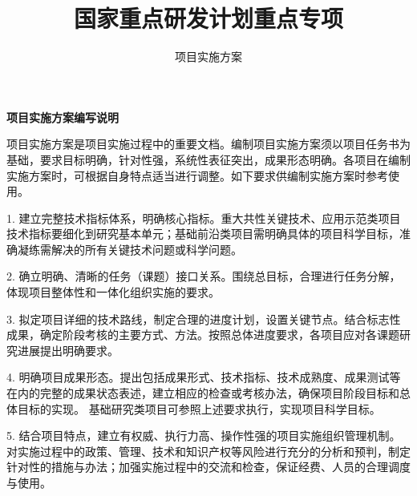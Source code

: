 \documentclass{icsartcn}
\begin{document}
\title{国家重点研发计划重点专项}                %
\subtitle{项目实施方案}             %

\author{}               %
\maketitle

\newpage


\large
\begin{center}
\bf\Large {项目实施方案编写说明}
\end{center}

项目实施方案是项目实施过程中的重要文档。编制项目实施方案须以项目任务书为基础，要求目标明确，针对性强，系统性表征突出，成果形态明确。各项目在编制实施方案时，可根据自身特点适当进行调整。如下要求供编制实施方案时参考使用。

1. 建立完整技术指标体系，明确核心指标。重大共性关键技术、应用示范类项目技术指标要细化到研究基本单元；基础前沿类项目需明确具体的项目科学目标，准确凝练需解决的所有关键技术问题或科学问题。

2. 确立明确、清晰的任务（课题）接口关系。围绕总目标，合理进行任务分解，体现项目整体性和一体化组织实施的要求。

3. 拟定项目详细的技术路线，制定合理的进度计划，设置关键节点。结合标志性成果，确定阶段考核的主要方式、方法。按照总体进度要求，各项目应对各课题研究进展提出明确要求。

4. 明确项目成果形态。提出包括成果形式、技术指标、技术成熟度、成果测试等在内的完整的成果状态表述，建立相应的检查或考核办法，确保项目阶段目标和总体目标的实现。
基础研究类项目可参照上述要求执行，实现项目科学目标。

5. 结合项目特点，建立有权威、执行力高、操作性强的项目实施组织管理机制。对实施过程中的政策、管理、技术和知识产权等风险进行充分的分析和预判，制定针对性的措施与办法；加强实施过程中的交流和检查，保证经费、人员的合理调度与使用。
\end{document}
